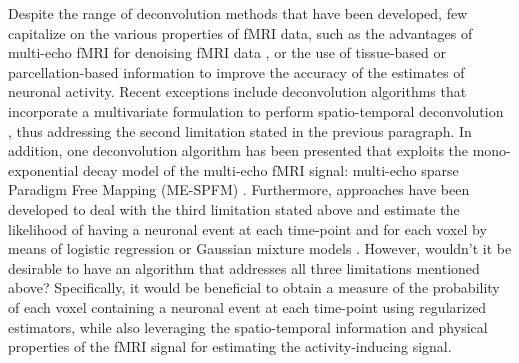 Despite the range of deconvolution methods that have been developed, few
capitalize on the various properties of fMRI data, such as the advantages of
multi-echo fMRI for denoising fMRI data
\citep{Bright2013Removingmotionphysiological, Kundu2017MultiechofMRI}, or the
use of tissue-based or parcellation-based information to improve the accuracy of
the estimates of neuronal activity. Recent exceptions include deconvolution
algorithms that incorporate a multivariate formulation to perform
spatio-temporal deconvolution
\citep{Bolton2019StructurallyInformedDeconvolution,Urunuela2021LowRankSparse,
Costantini2022Anisotropic4DFiltering,Cherkaoui2021Multivariatesemiblind}, thus
addressing the second limitation stated in the previous paragraph. In addition,
one deconvolution algorithm has been presented that exploits the
mono-exponential decay model of the multi-echo fMRI signal: multi-echo sparse
Paradigm Free Mapping (ME-SPFM) \citep{CaballeroGaudes2019deconvolutionalgorithmmulti}.
Furthermore, approaches have been developed to deal with the third limitation
stated above and estimate the likelihood of having a neuronal event at each
time-point and for each voxel by means of logistic regression
\citep{Bush2013Decodingneuralevents,Bush2015ImprovingprecisionfMRI} or Gaussian
mixture models \citep{Pidnebesna2019EstimatingSparseNeuronal}. However, wouldn't
it be desirable to have an algorithm that addresses all three limitations
mentioned above? Specifically, it would be beneficial to obtain a measure of the
probability of each voxel containing a neuronal event at each time-point using
regularized estimators, while also leveraging the spatio-temporal information
and physical properties of the fMRI signal for estimating the activity-inducing
signal.

